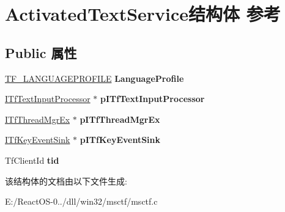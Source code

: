 \hypertarget{struct_activated_text_service}{}\section{Activated\+Text\+Service结构体 参考}
\label{struct_activated_text_service}
\subsection*{Public 属性}
\begin{DoxyCompactItemize}
\item 
\mbox{\label{struct_activated_text_service_a048a6a61576070fb8315eb457da17d99}} 
\hyperlink{struct_t_f___l_a_n_g_u_a_g_e_p_r_o_f_i_l_e}{T\+F\+\_\+\+L\+A\+N\+G\+U\+A\+G\+E\+P\+R\+O\+F\+I\+LE} {\bfseries Language\+Profile}
\item 
\mbox{\label{struct_activated_text_service_a394d190d7ebf981dcc95d9ba1290370d}} 
\hyperlink{interface_i_tf_text_input_processor}{I\+Tf\+Text\+Input\+Processor} $\ast$ {\bfseries p\+I\+Tf\+Text\+Input\+Processor}
\item 
\mbox{\label{struct_activated_text_service_addd4f0b839a31557b5aedfcdd47ed691}} 
\hyperlink{interface_i_tf_thread_mgr_ex}{I\+Tf\+Thread\+Mgr\+Ex} $\ast$ {\bfseries p\+I\+Tf\+Thread\+Mgr\+Ex}
\item 
\mbox{\label{struct_activated_text_service_a3d1746eba610a53302313feaad6cdb83}} 
\hyperlink{interface_i_tf_key_event_sink}{I\+Tf\+Key\+Event\+Sink} $\ast$ {\bfseries p\+I\+Tf\+Key\+Event\+Sink}
\item 
\mbox{\label{struct_activated_text_service_a914731bfc0382f19f038bbc83445311e}} 
Tf\+Client\+Id {\bfseries tid}
\end{DoxyCompactItemize}


该结构体的文档由以下文件生成\+:\begin{DoxyCompactItemize}
\item 
E\+:/\+React\+O\+S-\/0../dll/win32/msctf/msctf.\+c\end{DoxyCompactItemize}
